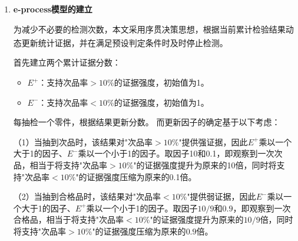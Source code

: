 \documentclass[withoutpreface,bwprint]{cumcmthesis}
\numberwithin{equation}{section}
\begin{document}
\begin{enumerate}[itemindent=2em]
    \hspace{2em}计算至多$k$个次品的概率：
    \begin{equation}
        P_{\text{d}} = P(K \leq k \mid p=0.1) = \sum_{i=0}^{k} \binom{n}{i} (0.1)^i (0.9)^{n-i}
    \end{equation}
     \hspace{2em}若$P_{\text{d}} < 10\%$，说明在"次品率$=10\%$"的假设下，合格品多得异常，拒绝$H_0'$，判定为接收。

     \hspace{2em}对于任意$(n,k)$，存在三种可能：
    \begin{itemize}[leftmargin=4em]
        \item $P_{\text{u}} < 5\%$：拒收
        \item $P_{\text{d}} < 10\%$：接收
        \item 两者均不满足：证据不足，继续抽样
    \end{itemize}

    \item \textbf{e-process模型的建立}
    
    \hspace{2em}为减少不必要的检测次数，本文采用序贯决策思想，根据当前累计检验结果动态更新统计证据，并在满足预设判定条件时及时停止检测\textsuperscript{\cite{shen2003}}。

    \hspace{2em}首先建立两个累计证据分数：
    \begin{itemize}[leftmargin=4em]
        \item $E^+$：支持次品率$>10\%$的证据强度，初始值为1。
        \item $E^-$：支持次品率$<10\%$的证据强度，初始值为1。
    \end{itemize}

    \hspace{2em}每抽检一个零件，根据结果更新分数。
而更新因子的确定基于以下考虑：

\hspace{2em}（1）当抽到次品时，该结果对"次品率$>10\%$"提供强证据，因此$E^+$乘以一个大于1的因子、$E^-$乘以一个小于1的因子。取因子10和0.1，即观察到一次次品，相当于将支持"次品率$>10\%$"的证据强度提升为原来的10倍，同时将支持"次品率$<10\%$"的证据强度压缩为原来的0.1倍。

\hspace{2em}（2）当抽到合格品时，该结果对"次品率$<10\%$"提供弱证据，因此$E^-$乘以一个大于1的因子、$E^+$乘以一个小于1的因子。取因子$10/9$和$0.9$，即观察到一次合格品，相当于将支持"次品率$<10\%$"的证据强度提升为原来的$10/9$倍，同时将支持"次品率$>10\%$"的证据强度压缩为原来的$0.9$倍。


\end{enumerate}
\end{document}
